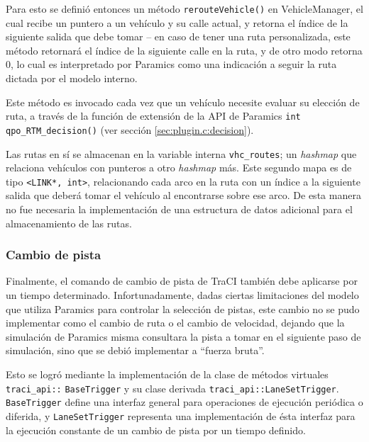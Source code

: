 Para esto se definió entonces un método \texttt{rerouteVehicle()} en VehicleManager, el cual recibe un puntero a un vehículo y su calle actual, y retorna el índice de la siguiente salida que debe tomar -- en caso de tener una ruta personalizada, este método retornará el índice de la siguiente calle en la ruta, y de otro modo retorna 0, lo cual es interpretado por Paramics como una indicación a seguir la ruta dictada por el modelo interno.



Este método es invocado cada vez que un vehículo necesite evaluar su elección de ruta, a través de la función de extensión de la API de Paramics \texttt{int qpo\_RTM\_decision()} (ver sección \ref{sec:plugin.c:decision}).

Las rutas en sí se almacenan en la variable interna \texttt{vhc\_routes}; un \emph{hashmap} que relaciona vehículos con punteros a otro \emph{hashmap} más. Este segundo mapa es de tipo 
\texttt{<LINK*, int>}, relacionando cada arco en la ruta con un índice a la siguiente salida que deberá tomar el vehículo al encontrarse sobre ese arco. De esta manera no fue necesaria la implementación de una estructura de datos adicional para el almacenamiento de las rutas.

\subsubsection{Cambio de pista}\label{sec:laneoverride}

Finalmente, el comando de cambio de pista de TraCI también debe aplicarse por un tiempo determinado. Infortunadamente, dadas ciertas limitaciones del modelo que utiliza Paramics para controlar la selección de pistas, este cambio no se pudo implementar como el cambio de ruta o el cambio de velocidad, dejando que la simulación de Paramics misma consultara la pista a tomar en el siguiente paso de simulación, sino que se debió implementar a ``fuerza bruta''.

Esto se logró mediante la implementación de la clase de métodos virtuales \texttt{traci\_api::}
\texttt{BaseTrigger} y su clase derivada \texttt{traci\_api::LaneSetTrigger}. \texttt{BaseTrigger} define una interfaz general para operaciones de ejecución periódica o diferida, y \texttt{LaneSetTrigger} representa una implementación de ésta interfaz para la ejecución constante de un cambio de pista por un tiempo definido.

